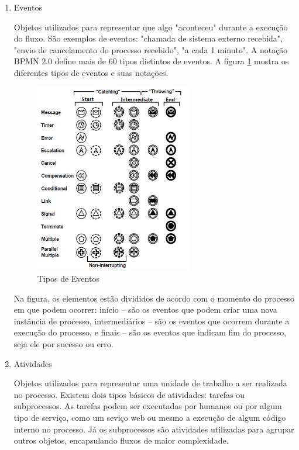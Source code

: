 \begin{enumerate}
    \item Eventos
    
    Objetos utilizados para representar que algo "aconteceu" durante a execução do fluxo. São exemplos de eventos: "chamada de sistema externo recebida", "envio de cancelamento do processo recebido", "a cada 1 minuto". A notação BPMN 2.0 define mais de 60 tipos distintos de eventos. A figura \ref{fig:bpmn_events} mostra os diferentes tipos de eventos e suas notações.
    
    \begin{figure}[H]
    \centering
    \includegraphics[width=0.65\textwidth]{imagens/bpmn_events.jpg}
    \caption{Tipos de Eventos\cite{tipos_eventos}}
    \label{fig:bpmn_events}
    \end{figure}
    
    Na figura, os elementos estão divididos de acordo com o momento do processo em que podem ocorrer: início -- são os eventos que podem criar uma nova instância de processo, intermediários -- são os eventos que ocorrem durante a execução do processo, e finais -- são os eventos que indicam fim do processo, seja ele por sucesso ou erro.
    
    \item Atividades
    
    Objetos utilizados para representar uma unidade de trabalho a ser realizada no processo. Existem dois tipos básicos de atividades: tarefas ou subprocessos. As tarefas podem ser executadas por humanos ou por algum tipo de serviço, como um seviço web ou mesmo a execução de algum código interno no processo. Já os subprocessos são atividades utilizadas para agrupar outros objetos, encapsulando fluxos de maior complexidade.
    

\end{enumerate}

